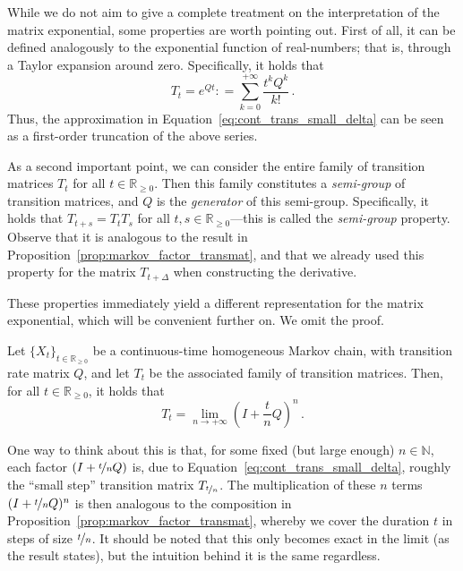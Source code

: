 \documentclass[graybox]{svmult}
\newcommand{\nats}{\mathbb{N}}
\newcommand{\reals}{\mathbb{R}}
\newcommand{\realsnonneg}{\reals_{\geq 0}}
\newcommand{\coloneqq}{:\!=}
\begin{document}
While we do not aim to give a complete treatment on the interpretation of the matrix exponential, some properties are worth pointing out. First of all, it can be defined analogously to the exponential function of real-numbers; that is, through a Taylor expansion around zero. Specifically, it holds that
\begin{equation*}
T_t = e^{Qt} \coloneqq \sum_{k=0}^{+\infty} \frac{t^kQ^k}{k!}\,.
\end{equation*}
Thus, the approximation in Equation~\eqref{eq:cont_trans_small_delta} can be seen as a first-order truncation of the above series.

As a second important point, we can consider the entire family of transition matrices $T_t$ for all $t\in\realsnonneg$. Then this family constitutes a \emph{semi-group} of transition matrices, and $Q$ is the \emph{generator} of this semi-group. Specifically, it holds that $T_{t+s}=T_tT_s$ for all $t,s\in\realsnonneg$---this is called the \emph{semi-group} property. Observe that it is analogous to the result in Proposition~\ref{prop:markov_factor_transmat}, and that we already used this property for the matrix $T_{t+\Delta}$ when constructing the derivative.

These properties immediately yield a different representation for the matrix exponential, which will be convenient further on. We omit the proof.
\begin{proposition}\label{prop:matrix_exp_convenient_steps}
Let $\{X_t\}_{t\in\realsnonneg}$ be a continuous-time homogeneous Markov chain, with transition rate matrix $Q$, and let $T_t$ be the associated family of transition matrices. Then, for all $t\in\realsnonneg$, it holds that
\begin{equation*}
T_t = \lim_{n\to+\infty} \left(I+\frac{t}{n}Q\right)^n\,.
\end{equation*}
\end{proposition}
One way to think about this is that, for some fixed (but large enough) $n\in\nats$, each factor $(I+\nicefrac{t}{n}Q)$ is, due to Equation~\eqref{eq:cont_trans_small_delta}, roughly the ``small step'' transition matrix $T_{\nicefrac{t}{n}}$. The multiplication of these $n$ terms $(I+\nicefrac{t}{n}Q)^n$ is then analogous to the composition in Proposition~\ref{prop:markov_factor_transmat}, whereby we cover the duration $t$ in steps of size $\nicefrac{t}{n}$. It should be noted that this only becomes exact in the limit (as the result states), but the intuition behind it is the same regardless.
\end{document}
